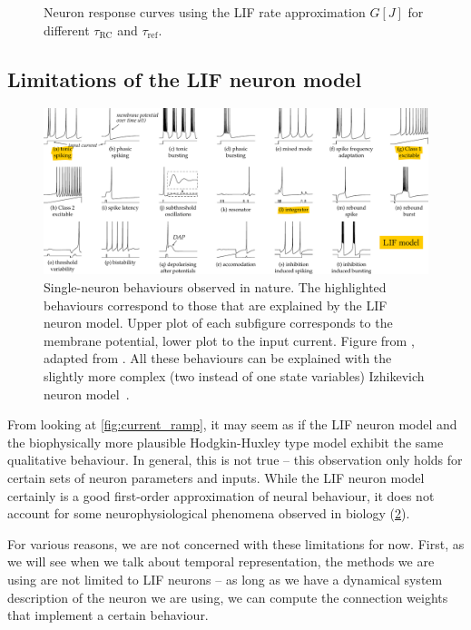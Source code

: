 \documentclass[10pt,letterpaper,oneside]{article}
\begin{document}
\begin{figure}
\begin{subfigure}{0.5\textwidth}
	\end{subfigure}%
	\caption{Neuron response curves using the LIF rate approximation $G[J]$ for different $\tau_\mathrm{RC}$ and $\tau_\mathrm{ref}$.}
	\label{fig:lif_neuron_rate}
\end{figure}

\subsection{Limitations of the LIF neuron model}

\begin{figure}
	\includegraphics[width=\textwidth]{media/izhikevich_whichmod_figure2.pdf}
	\caption{Single-neuron behaviours observed in nature. The highlighted behaviours correspond to those that are explained by the LIF neuron model. Upper plot of each subfigure corresponds to the membrane potential, lower plot to the input current. Figure from \cite{stoeckel2015design}, adapted from \cite{izhikevich2004model}. All these behaviours can be explained with the slightly more complex (two instead of one state variables) Izhikevich neuron model~\cite{izhikevich2003simple}.}
	\label{fig:izhikevich_whichmod_figure2}
\end{figure}

From looking at \cref{fig:current_ramp}, it may seem as if the LIF neuron model and the biophysically more plausible Hodgkin-Huxley type model exhibit the same qualitative behaviour. In general, this is not true -- this observation only holds for certain sets of neuron parameters and inputs. While the LIF neuron model certainly is a good first-order approximation of neural behaviour, it does not account for some neurophysiological phenomena observed in biology (\cref{fig:izhikevich_whichmod_figure2}).

For various reasons, we are not concerned with these limitations for now. First, as we will see when we talk about temporal representation, the methods we are using are not limited to LIF neurons -- as long as we have a dynamical system description of the neuron we are using, we can compute the connection weights that implement a certain behaviour.
\end{document}
